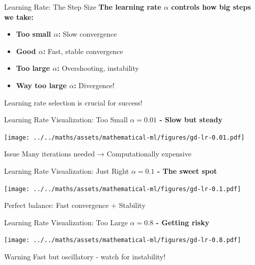 \documentclass[usenames,dvipsnames]{beamer}
\begin{document}
  \begin{frame}{Learning Rate: The Step Size}
    \textbf{The learning rate $\alpha$ controls how big steps we take:}
    
    \begin{itemize}[<+->]
        \item \textbf{Too small $\alpha$:} Slow convergence
        \item \textbf{Good $\alpha$:} Fast, stable convergence  
        \item \textbf{Too large $\alpha$:} Overshooting, instability
        \item \textbf{Way too large $\alpha$:} Divergence!
    \end{itemize}
    
    \pause
    \begin{keypointsbox}
    Learning rate selection is crucial for success!
    \end{keypointsbox}
  \end{frame}

  \begin{frame}{Learning Rate Visualization: Too Small}
    \textbf{$\alpha = 0.01$ - Slow but steady}
    \begin{center}
    \texttt{[image: ../../maths/assets/mathematical-ml/figures/gd-lr-0.01.pdf]}
    \end{center}
    
    \begin{alertbox}{Issue}
    Many iterations needed → Computationally expensive
    \end{alertbox}
  \end{frame}

  \begin{frame}{Learning Rate Visualization: Just Right}
    \textbf{$\alpha = 0.1$ - The sweet spot}
    \begin{center}
    \texttt{[image: ../../maths/assets/mathematical-ml/figures/gd-lr-0.1.pdf]}
    \end{center}
    
    \begin{keypointsbox}
    Perfect balance: Fast convergence + Stability
    \end{keypointsbox}
  \end{frame}

  \begin{frame}{Learning Rate Visualization: Too Large}
    \textbf{$\alpha = 0.8$ - Getting risky}
    \begin{center}
    \texttt{[image: ../../maths/assets/mathematical-ml/figures/gd-lr-0.8.pdf]}
    \end{center}
    
    \begin{alertbox}{Warning}
    Fast but oscillatory - watch for instability!
    \end{alertbox}
  \end{frame}
\end{document}
